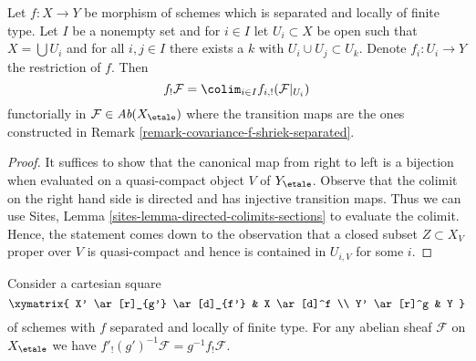 \begin{lemma}
\label{lemma-colim-f-shriek-separated}
Let $f : X \to Y$ be morphism of schemes which is separated and
locally of finite type. Let $I$ be a nonempty set and for $i \in I$
let $U_i \subset X$ be open such that $X = \bigcup U_i$ and
for all $i, j \in I$ there exists a $k$ with $U_i \cup U_j \subset U_k$.
Denote $f_i : U_i \to Y$ the restriction of $f$.
Then
$$
f_!\mathcal{F} = \colim_{i \in I} f_{i, !}(\mathcal{F}|_{U_i})
$$
functorially in $\mathcal{F} \in \textit{Ab}(X_\etale)$
where the transition maps are the ones constructed in
Remark \ref{remark-covariance-f-shriek-separated}.
\end{lemma}

\begin{proof}
It suffices to show that the canonical map from
right to left is a bijection when evaluated on a quasi-compact
object $V$ of $Y_\etale$.
Observe that the colimit on the right hand side is directed
and has injective transition maps.
Thus we can use
Sites, Lemma \ref{sites-lemma-directed-colimits-sections}
to evaluate the colimit. Hence, the statement comes down
to the observation that a closed subset $Z \subset X_V$ proper over $V$
is quasi-compact and hence is contained in $U_{i, V}$ for some $i$.
\end{proof}

\begin{lemma}
\label{lemma-base-change-f-shriek-separated}
Consider a cartesian square
$$
\xymatrix{
X' \ar[r]_{g'} \ar[d]_{f'} & X \ar[d]^f \\
Y' \ar[r]^g & Y
}
$$
of schemes with $f$ separated and locally of finite type.
For any abelian sheaf $\mathcal{F}$ on $X_\etale$ we have
$f'_!(g')^{-1}\mathcal{F} = g^{-1}f_!\mathcal{F}$.
\end{lemma}

